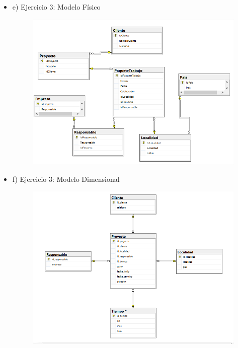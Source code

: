 \begin{itemize}
	\item e) Ejercicio 3:  Modelo Físico
		\begin{figure}[H]
		\begin{center}
		\includegraphics[width=18cm]{./Imagenes/imagen5}
		\end{center}
		\end{figure}
     
     
	\item f) Ejercicio 3:   Modelo Dimensional
		\begin{figure}[H]
		\begin{center}
		\includegraphics[width=18cm]{./Imagenes/imagen6}
		\end{center}
		\end{figure}
     



\end{itemize}
		